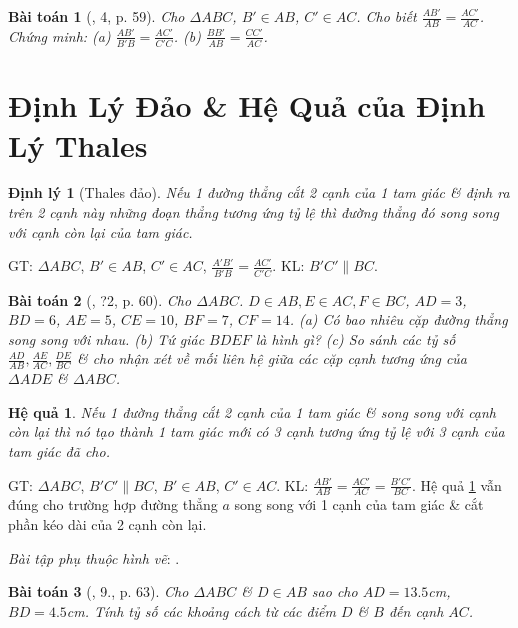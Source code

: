 \documentclass{article}
\newtheorem{baitoan}{Bài toán}
\newtheorem{dinhly}{Định lý}
\newtheorem{hequa}{Hệ quả}
\begin{document}
\begin{baitoan}[\cite{SGK_Toan_8_tap_2}, 4, p. 59]
	Cho $\Delta ABC$, $B'\in AB$, $C'\in AC$. Cho biết $\frac{AB'}{AB} = \frac{AC'}{AC}$. Chứng minh: (a) $\frac{AB'}{B'B} = \frac{AC'}{C'C}$. (b) $\frac{BB'}{AB} = \frac{CC'}{AC}$.
\end{baitoan}


\section{Định Lý Đảo \& Hệ Quả của Định Lý Thales}

\begin{dinhly}[Thales đảo]
	Nếu 1 đường thẳng cắt 2 cạnh của 1 tam giác \& định ra trên 2 cạnh này những đoạn thẳng tương ứng tỷ lệ thì đường thẳng đó song song với cạnh còn lại của tam giác.
\end{dinhly}
GT: $\Delta ABC$, $B'\in AB$, $C'\in AC$, $\frac{A'B'}{B'B} = \frac{AC'}{C'C}$. KL: $B'C'\parallel BC$.

\begin{baitoan}[\cite{SGK_Toan_8_tap_2}, ?2, p. 60]
	Cho $\Delta ABC$. $D\in AB,E\in AC,F\in BC$, $AD = 3$, $BD = 6$, $AE = 5$, $CE = 10$, $BF = 7$, $CF = 14$. (a) Có bao nhiêu cặp đường thẳng song song với nhau. (b) Tứ giác $BDEF$ là hình gì? (c) So sánh các tỷ số $\frac{AD}{AB},\frac{AE}{AC},\frac{DE}{BC}$ \& cho nhận xét về mối liên hệ giữa các cặp cạnh tương ứng của $\Delta ADE$ \& $\Delta ABC$.
\end{baitoan}

\begin{hequa}
	\label{col: Thales}
	Nếu 1 đường thẳng cắt 2 cạnh của 1 tam giác \& song song với cạnh còn lại thì nó tạo thành 1 tam giác mới có 3 cạnh tương ứng tỷ lệ với 3 cạnh của tam giác đã cho.
\end{hequa}
GT: $\Delta ABC$, $B'C'\parallel BC$, $B'\in AB$, $C'\in AC$. KL: $\frac{AB'}{AB} = \frac{AC'}{AC} = \frac{B'C'}{BC}$. Hệ quả \ref{col: Thales} vẫn đúng cho trường hợp đường thẳng $a$ song song với 1 cạnh của tam giác \& cắt phần kéo dài của 2 cạnh còn lại.

\textit{Bài tập phụ thuộc hình vẽ}: \cite[?3, 6.--8., pp. 62--63]{SGK_Toan_8_tap_2}.

\begin{baitoan}[\cite{SGK_Toan_8_tap_2}, 9., p. 63]
	Cho $\Delta ABC$ \& $D\in AB$ sao cho $AD = 13.5$\emph{cm}, $BD = 4.5$\emph{cm}. Tính tỷ số các khoảng cách từ các điểm $D$ \& $B$ đến cạnh $AC$.
\end{baitoan}
\end{document}
